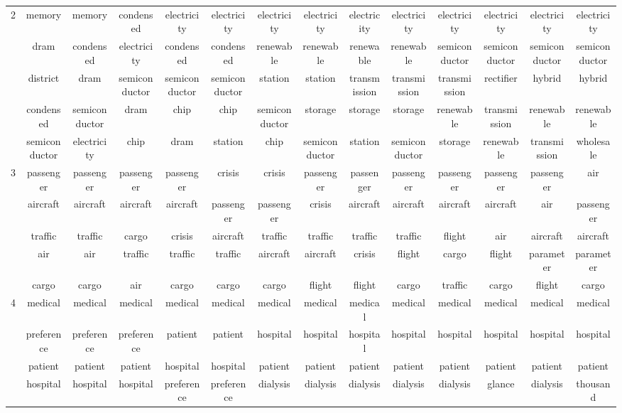 \documentclass[12pt,journal,letterpaper,oneside,onecolumn]{IEEEtran}
\begin{document}
\begin{center}
{\begin{tabular}{c|c|c|c|c|c|c|c|c|c|c|c|c|c}
        \hline
        2 & memory & memory & condensed & electricity & electricity & electricity & electricity & electricity & electricity & electricity & electricity & electricity & electricity \\ 
         & dram & condensed & electricity & condensed & condensed & renewable & renewable & renewable & renewable & semiconductor & semiconductor & semiconductor & semiconductor \\ 
         & district & dram & semiconductor & semiconductor & semiconductor & station & station & transmission & transmission & transmission & rectifier & hybrid & hybrid \\ 
         & condensed & semiconductor & dram & chip & chip & semiconductor & storage & storage & storage & renewable & transmission & renewable & renewable \\ 
         & semiconductor & electricity & chip & dram & station & chip & semiconductor & station & semiconductor & storage & renewable & transmission & wholesale \\ 
        \hline
        3 & passenger & passenger & passenger & passenger & crisis & crisis & passenger & passenger & passenger & passenger & passenger & passenger & air \\ 
         & aircraft & aircraft & aircraft & aircraft & passenger & passenger & crisis & aircraft & aircraft & aircraft & aircraft & air & passenger \\ 
         & traffic & traffic & cargo & crisis & aircraft & traffic & traffic & traffic & traffic & flight & air & aircraft & aircraft \\ 
         & air & air & traffic & traffic & traffic & aircraft & aircraft & crisis & flight & cargo & flight & parameter & parameter \\ 
         & cargo & cargo & air & cargo & cargo & cargo & flight & flight & cargo & traffic & cargo & flight & cargo \\ 
        \hline
        4 & medical & medical & medical & medical & medical & medical & medical & medical & medical & medical & medical & medical & medical \\ 
         & preference & preference & preference & patient & patient & hospital & hospital & hospital & hospital & hospital & hospital & hospital & hospital \\ 
         & patient & patient & patient & hospital & hospital & patient & patient & patient & patient & patient & patient & patient & patient \\ 
         & hospital & hospital & hospital & preference & preference & dialysis & dialysis & dialysis & dialysis & dialysis & glance & dialysis & thousand \\ 

\end{tabular}}
\end{center}
\end{document}
